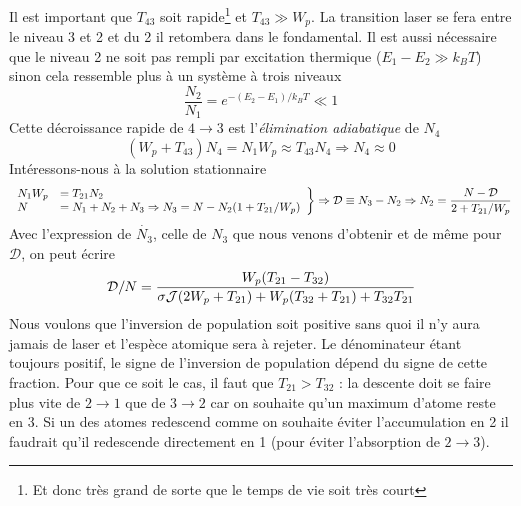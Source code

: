 Il est important que $T_{43}$ soit rapide\footnote{Et donc très grand de sorte que le temps de vie soit très court} et $T_{43}\gg W_p$. La transition laser se fera entre le niveau 3 et 2 et du 2 il
retombera dans le fondamental. Il est aussi nécessaire que le niveau 2 ne soit pas rempli par excitation thermique ($E_1-E_2\gg k_BT$)  sinon cela ressemble plus à un système à trois niveaux
\begin{equation}
\dfrac{N_2}{N_1} = e^{-(E_2-E_1)/k_BT} \ll 1
\end{equation}
Cette décroissance rapide de $4\to3$ est l'\textit{élimination adiabatique} de $N_4$
\begin{equation}
({W_p} + {T_{43}}){N_4} = {N_1}{W_p} \approx {T_{43}}{N_4} \Rightarrow {N_4} \approx 0
\end{equation}
Intéressons-nous à la solution stationnaire
\begin{equation}
\left.\begin{array}{ll}
{N_1}{W_p} &= {T_{21}}{N_2}\\
N &= {N_1} + {N_2} + {N_3} \Rightarrow {N_3} = N - {N_2}(1 + {T_{21}}/{W_p})
\end{array}\right\}\Rightarrow {{\cal D}} \equiv {N_3} - {N_2} \Rightarrow {N_2} = 
\dfrac{N-\mathcal{D}}{2 + {T_{21}}/{W_p}}
\end{equation}
Avec l'expression de $\dot{N_3}$, celle de $N_3$ que nous venons d'obtenir et de même pour 
$\mathcal{D}$, on peut écrire
\begin{equation}
{{\cal D}}/N = \frac{{{W_p}({T_{21}} - {T_{32}})}}{{\sigma {{\cal J}}(2{W_p} + {T_{21}}) + {W_p}
({T_{32}} + {T_{21}}) + {T_{32}}{T_{21}}}}
\end{equation}
Nous voulons que l'inversion de population soit positive sans quoi il n'y aura jamais de laser et
l'espèce atomique sera à rejeter. Le dénominateur étant toujours positif, le signe de l'inversion 
de population dépend du signe de cette fraction. Pour que ce soit le cas, il faut que $T_{21}>
T_{32}$ : la descente doit se faire plus vite de $2\to 1$ que de $3\to2$ car on souhaite qu'un 
maximum d'atome reste en 3. Si un des atomes redescend comme on souhaite éviter l'accumulation en 2
il faudrait qu'il redescende directement en 1 (pour éviter l'absorption de $2\to 3$).\\

